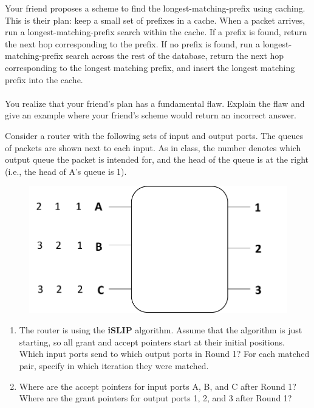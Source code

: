 \documentclass[10pt]{article}
\newenvironment{problem}[2][]{\begin{trivlist}
\item[\hskip \labelsep {\bfseries #1}\hskip \labelsep {\bfseries #2.}]}{\end{trivlist}}
\begin{document}
\begin{problem}{2: Longest Matching Prefix Caching}
Your friend proposes a scheme to find the longest-matching-prefix using caching. This is their plan: keep a small set of prefixes in a cache. When a packet arrives,  run a longest-matching-prefix search within the cache. If a prefix is found, return the next hop corresponding to the prefix. If no prefix is found, run a longest-matching-prefix search across the rest of the database, return the next hop corresponding to the longest matching prefix, and insert the longest matching prefix into the cache. \\\\
You realize that your friend's plan has a fundamental flaw. Explain the flaw and give an example where your friend's scheme would return an incorrect answer.
\end{problem}
\begin{problem}{3: Switching}
Consider a router with the following sets of input and output ports. The queues of packets are shown next to each input. As in class, the number denotes which output queue the packet is intended for, and the head of the queue is at the right (i.e., the head of A's queue is 1).

\begin{figure}[h]
    \centering
    \includegraphics[scale=0.6]{figures/islip.pdf}
    \label{fig:islip}
\end{figure}

\begin{enumerate}
    \item The router is using the \textbf{iSLIP} algorithm. Assume that the algorithm is just starting, so all grant and accept pointers start at their initial positions. Which input ports send to which output ports in Round 1? For each matched pair, specify in which iteration they were matched. 
    \item Where are the accept pointers for input ports A, B, and C after Round 1? Where are the grant pointers for output ports 1, 2, and 3 after Round 1?
\end{enumerate}
\end{problem}
\end{document}
